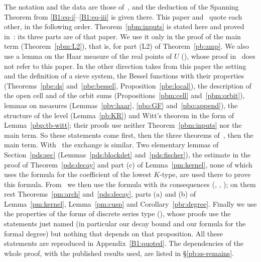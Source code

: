 \documentclass[10pt]{amsart}
\theoremstyle{definition}
\theoremstyle{remark}
\begin{document}
The notation and the data are those of~\cite{P46}, and the deduction of the Spanning Theorem from
\eqref{B1:eq-i}--\eqref{B1:eq-iii} is given there. This paper and~\cite{P52} quote each other,
in the following order. Theorem~\ref{pbm:inputs} is stated here and proved in~\cite{P52}: its three parts are
{\cite[Theorems~2.17, 5.28 and~5.29]{P52}} of that paper. We use it only in the
proof of the main term (Theorem~\ref{pbm:L2}), that is, for part (L2) of Theorem~\ref{pb:amp}. We also use a lemma on the Haar measure of the real
points of $U$ ({\cite[Lemma~4.1]{P52}}), whose proof in~\cite{P52} does not refer to this paper. In the other direction \cite{P52} takes from this paper the
setting and the definition of a sieve system, the Bessel functions with their properties
(Theorems~\ref{pbe:ds} and~\ref{pbe:bessel}, Proposition~\ref{pbe:local}), the description of the
open cell and of the orbit sums (Propositions~\ref{pbm:cell} and~\ref{pbm:orbit}), lemmas on
measures (Lemmas~\ref{pbv:haar}, \ref{pbo:GF} and~\ref{pbo:append}), the structure of the level (Lemma~\ref{pb:KR}) and Witt's theorem in the form of Lemma~\ref{pbp:tb-witt}; their proofs use neither
Theorem~\ref{pbm:inputs} nor the main term. So these statements come first, then the three theorems of~\cite{P52}, then the main term. With~\cite{P49} the exchange is similar.
Two elementary lemmas of Section~\ref{pds:sec} (Lemmas~\ref{pds:blockdet} and~\ref{pds:fischer}), the estimate in the proof of Theorem~\ref{pds:decay} and
part (c) of Lemma~\ref{pm:kernel}, none of which uses the formula for the coefficient of
the lowest $K$-type, are used there to prove this formula. From~\cite{P49} we then use the formula with its consequences
({\cite[Theorem~3.17]{P49}}, {\cite[Proposition~3.21]{P49}}, {\cite[Lemma~3.25]{P49}}); on them rest Theorems~\ref{pm:arch} and~\ref{pds:decay}, parts (a) and (b) of Lemma~\ref{pm:kernel}, Lemma~\ref{pm:cusp} and Corollary~\ref{pbr:degree}. Finally we use the properties of
the forms of discrete series type ({\cite[Proposition~8.4]{P49}}), whose proofs use the statements just named
(in particular our decay bound and our formula for the formal degree) but
nothing that depends on that proposition. All these statements are reproduced in
Appendix~\ref{B1:quoted}. The dependencies of the whole proof, with the published results used,
are listed in \S\ref{pb:ss-remains}.
\end{document}
